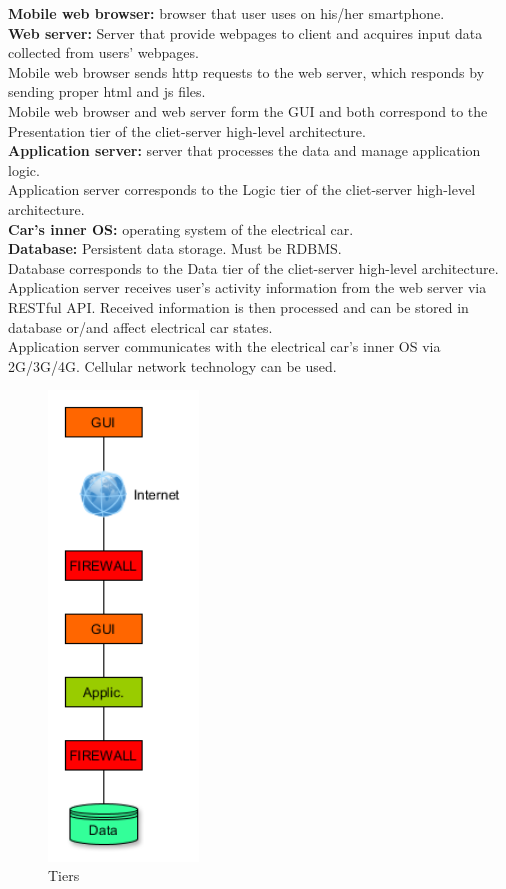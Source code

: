 \documentclass[12pt, letterpaper]{article}
\begin{document}
\textbf{Mobile web browser:} browser that user uses on his/her smartphone. \\ 
\vspace{0.5cm}
\textbf{Web server:} Server that provide webpages to client and acquires input data collected from users' webpages. \\
Mobile web browser sends http requests to the web server, which responds by sending proper html and js files. \\
Mobile web browser and web server form the GUI and both correspond to the Presentation tier of the cliet-server high-level architecture. \\
\vspace{0.5cm}
\textbf{Application server:} server that processes the data and manage application logic. \\ 
Application server corresponds to the Logic tier of the cliet-server high-level architecture. \\
\vspace{0.5cm}
\textbf{Car's inner OS:} operating system of the electrical car. \\ 
\vspace{0.5cm}
\textbf{Database:} Persistent data storage. Must be RDBMS. \\
Database corresponds to the Data tier of the cliet-server high-level architecture. \\
\vspace{0.5cm}
Application server receives user's activity information from the web server via RESTful API. Received information is then processed and can be stored in database or/and affect electrical car states. \\
Application server communicates with the electrical car's inner OS via 2G/3G/4G. Cellular network technology can be used. \\
\vspace{0.5cm}

\begin{figure}[H]
\centering
\includegraphics[width=4cm]{tiers.png}
\caption{Tiers}
\label{fig:tiers}
\end{figure}
\end{document}
